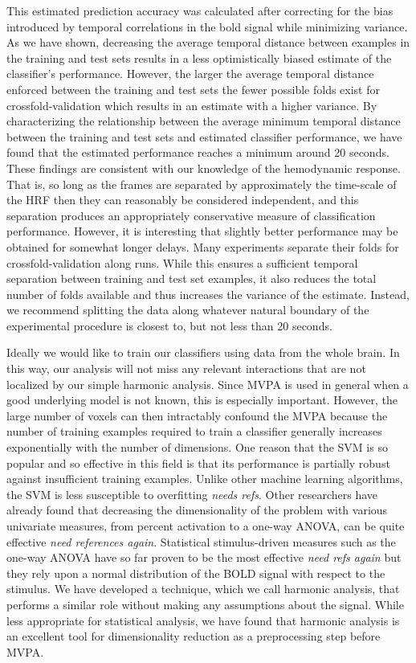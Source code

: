 \documentclass[preprint,5p,authoryear]{elsarticle}
\begin{document}
This estimated prediction accuracy was calculated after correcting for the bias introduced by temporal correlations in the bold signal while minimizing variance.
As we have shown, decreasing the average temporal distance between examples in the training and test sets results in a less optimistically biased estimate of the classifier's performance.
However, the larger the average temporal distance enforced between the training and test sets the fewer possible folds exist for crossfold-validation which results in an estimate with a higher variance.
By characterizing the relationship between the average minimum temporal distance between the training and test sets and estimated classifier performance, we have found that the estimated performance reaches a minimum around 20 seconds.
These findings are consistent with our knowledge of the hemodynamic response.
That is, so long as the frames are separated by approximately the time-scale of the HRF then they can reasonably be considered independent, and this separation produces an appropriately conservative measure of classification performance. 
However, it is interesting that slightly better performance may be obtained for somewhat longer delays.
Many experiments separate their folds for crossfold-validation along runs.
While this ensures a sufficient temporal separation between training and test set examples, it also reduces the total number of folds available and thus increases the variance of the estimate.
Instead, we recommend splitting the data along whatever natural boundary of the experimental procedure is closest to, but not less than 20 seconds.

Ideally we would like to train our classifiers using data from the whole brain.
In this way, our analysis will not miss any relevant interactions that are not localized by our simple harmonic analysis.
Since MVPA is used in general when a good underlying model is not known, this is especially important.
However, the large number of voxels can then intractably confound the MVPA because
the number of training examples required to train a classifier generally increases exponentially with the number of dimensions.
One reason that the SVM is so popular and so effective in this field is that its performance is partially robust against insufficient training examples.
Unlike other machine learning algorithms, the SVM is less susceptible to overfitting \emph{needs refs}.
Other researchers have already found that decreasing the dimensionality of the problem with various univariate measures, from percent activation to a one-way ANOVA, can be quite effective \emph{need references again}.
Statistical stimulus-driven measures such as the one-way ANOVA have so far proven to be the most effective \emph{need refs again} but they rely upon a normal distribution of the BOLD signal with respect to the stimulus.
We have developed a technique, which we call harmonic analysis, that performs a similar role without making any assumptions about the signal.
While less appropriate for statistical analysis, we have found that harmonic analysis is an excellent tool for dimensionality reduction as a preprocessing step before MVPA.
\end{document}
